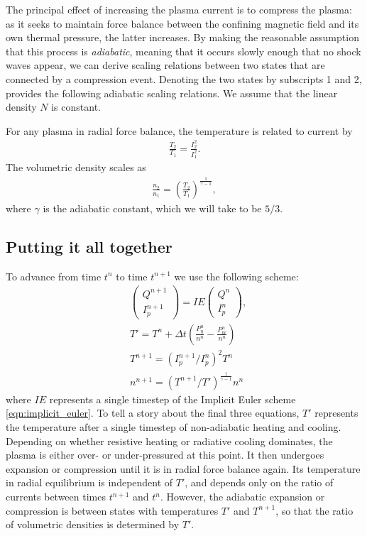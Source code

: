 \documentclass{article}
\begin{document}
The principal effect of increasing the plasma current is to compress the plasma: as it seeks
to maintain force balance between the confining magnetic field and its own thermal pressure,
the latter increases.
By making the reasonable assumption that this process is \emph{adiabatic}, meaning that
it occurs slowly enough that no shock waves appear, we can derive scaling relations between
two states that are connected by a compression event.
Denoting the two states by subscripts 1 and 2, \cite{shumlakShearedFlowStabilizedZPinch2012}
provides the following adiabatic scaling relations.
We assume that the linear density $N$ is constant.

For any plasma in radial force balance, the temperature is related to current by
\begin{align*}
\frac{T_2}{T_1} = \frac{I_2^2}{I_1^2}.
\end{align*}
The volumetric density scales as
\begin{align*}
    \frac{n_2}{n_1} = \left( \frac{T_2}{T_1} \right)^{\frac{1}{\gamma-1}},
\end{align*}
where $\gamma$ is the adiabatic constant, which we will take to be $5/3$.

\subsection{Putting it all together}

To advance from time $t^n$ to time $t^{n+1}$ we use the following scheme:
\begin{align*}
    &\begin{pmatrix}
        Q^{n+1} \\
        I_p^{n+1}
    \end{pmatrix} = IE \begin{pmatrix}
    Q^n \\ I_p^n
    \end{pmatrix}, \\
    &T' = T^n + \Delta t \left( \frac{P_{\eta}^n}{n^n} - \frac{P_{br}^n}{n^n} \right) \\
    &T^{n+1} = (I_p^{n+1}/I_p^n)^2 T^n \\
    &n^{n+1} = (T^{n+1} / T')^{\frac{1}{\gamma-1}} n^n
\end{align*}
where $IE$ represents a single timestep of the Implicit Euler scheme \eqref{eqn:implicit_euler}.
To tell a story about the final three equations, $T'$ represents the temperature after
a single timestep of non-adiabatic heating and cooling.
Depending on whether resistive heating or radiative cooling dominates, the plasma is either over- or under-pressured
at this point.
It then undergoes expansion or compression until it is in radial force balance again.
Its temperature in radial equilibrium is independent of $T'$, and depends only on the ratio of currents
between times $t^{n+1}$ and $t^n$.
However, the adiabatic expansion or compression is between states with temperatures $T'$ and $T^{n+1}$,
so that the ratio of volumetric densities is determined by $T'$.
\end{document}
